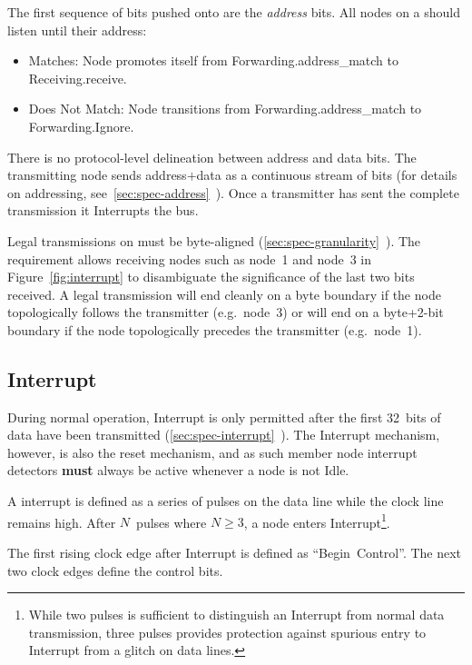 The first sequence of bits pushed onto \bus are the {\em address} bits. All
nodes on a \bus should listen until their address:
\begin{itemize}
  \item Matches: Node promotes itself from Forwarding.{\sc address\_match} to
    Receiving.{\sc receive}.
  \item Does Not Match: Node transitions from Forwarding.{\sc address\_match}
    to Forwarding.{\sc Ignore}.
\end{itemize}

There is no protocol-level delineation between address and data bits. The
transmitting node sends address$+$data as a continuous stream of bits (for
details on \bus addressing,
see~\ref{sec:spec-address}~). Once a transmitter has
sent the complete transmission it Interrupts the bus.

Legal transmissions on \bus must be byte-aligned
(\ref{sec:spec-granularity}~). The requirement
allows receiving nodes such as node~1 and node~3 in Figure~\ref{fig:interrupt}
to disambiguate the significance of the last two bits received. A legal
transmission will end cleanly on a byte boundary if the node topologically
follows the transmitter (e.g.~node~3) or will end on a byte+2-bit boundary if
the node topologically precedes the transmitter (e.g.~node~1).

\subsection{Interrupt}
\label{sec:protocol-interrupt}
During normal operation, Interrupt is only permitted after the first 32~bits
of data have been transmitted
(\ref{sec:spec-interrupt}~). The Interrupt
mechanism, however, is also the \bus reset mechanism, and as such member node
interrupt detectors {\bf must} always be active whenever a node is not Idle.

A \bus interrupt is defined as a series of pulses on the data line while the
clock line remains high. After $N$~pulses where $N \ge 3$, a node enters
Interrupt\footnote{
  While two pulses is sufficient to distinguish an Interrupt from normal data
  transmission, three pulses provides protection against spurious entry to
  Interrupt from a glitch on data lines.}.

The first rising clock edge after Interrupt is defined as ``Begin~Control''.
The next two clock edges define the control bits.

